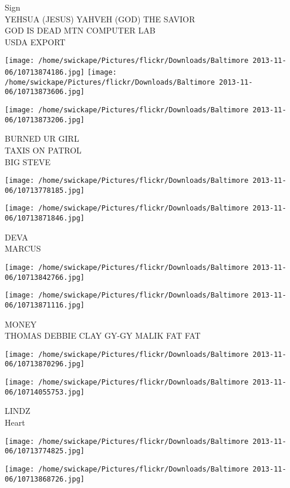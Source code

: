\documentclass[10pt,letterpaper]{article}
\begin{document}
Sign\\
YEHSUA (JESUS) YAHVEH (GOD) THE SAVIOR\\
GOD IS DEAD MTN COMPUTER LAB\\
USDA EXPORT
\pagebreak

\texttt{[image: /home/swickape/Pictures/flickr/Downloads/Baltimore 2013-11-06/10713874186.jpg]}
\texttt{[image: /home/swickape/Pictures/flickr/Downloads/Baltimore 2013-11-06/10713873606.jpg]}

\vspace{0.25in}
\texttt{[image: /home/swickape/Pictures/flickr/Downloads/Baltimore 2013-11-06/10713873206.jpg]}

BURNED UR GIRL\\
TAXIS ON PATROL\\
BIG STEVE
\pagebreak

\texttt{[image: /home/swickape/Pictures/flickr/Downloads/Baltimore 2013-11-06/10713778185.jpg]}

\vspace{0.25in}
\texttt{[image: /home/swickape/Pictures/flickr/Downloads/Baltimore 2013-11-06/10713871846.jpg]}

DEVA\\
MARCUS
\pagebreak

\texttt{[image: /home/swickape/Pictures/flickr/Downloads/Baltimore 2013-11-06/10713842766.jpg]}

\vspace{0.25in}
\texttt{[image: /home/swickape/Pictures/flickr/Downloads/Baltimore 2013-11-06/10713871116.jpg]}

MONEY\\
THOMAS DEBBIE CLAY GY{-}GY MALIK FAT FAT
\pagebreak

\texttt{[image: /home/swickape/Pictures/flickr/Downloads/Baltimore 2013-11-06/10713870296.jpg]}

\vspace{0.25in}
\texttt{[image: /home/swickape/Pictures/flickr/Downloads/Baltimore 2013-11-06/10714055753.jpg]}

LINDZ\\
Heart
\pagebreak

\texttt{[image: /home/swickape/Pictures/flickr/Downloads/Baltimore 2013-11-06/10713774825.jpg]}

\vspace{0.25in}
\texttt{[image: /home/swickape/Pictures/flickr/Downloads/Baltimore 2013-11-06/10713868726.jpg]}
\end{document}
